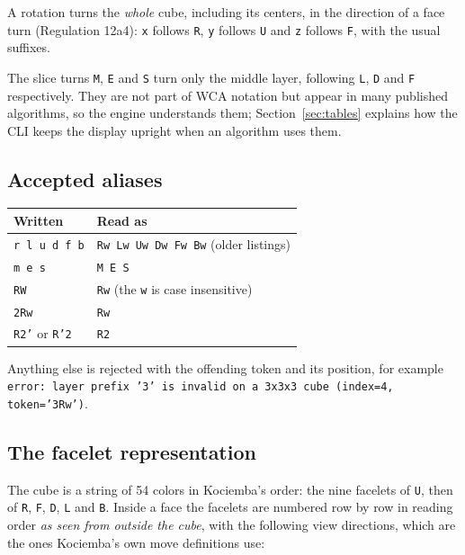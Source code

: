 A rotation turns the \emph{whole} cube, including its centers, in the direction of
a face turn (Regulation 12a4): \texttt{x} follows \texttt{R}, \texttt{y} follows
\texttt{U} and \texttt{z} follows \texttt{F}, with the usual suffixes.

The slice turns \texttt{M}, \texttt{E} and \texttt{S} turn only the middle layer,
following \texttt{L}, \texttt{D} and \texttt{F} respectively.  They are not part of
WCA notation but appear in many published algorithms, so the engine understands
them; Section~\ref{sec:tables} explains how the CLI keeps the display upright when
an algorithm uses them.

\subsection{Accepted aliases}

\begin{center}
\begin{tabular}{@{}ll@{}}
\toprule
Written & Read as \\
\midrule
\texttt{r l u d f b} & \texttt{Rw Lw Uw Dw Fw Bw} (older listings) \\
\texttt{m e s} & \texttt{M E S} \\
\texttt{RW} & \texttt{Rw} (the \texttt{w} is case insensitive) \\
\texttt{2Rw} & \texttt{Rw} \\
\texttt{R2'} or \texttt{R'2} & \texttt{R2} \\
\bottomrule
\end{tabular}
\end{center}

Anything else is rejected with the offending token and its position, for example
\texttt{error: layer prefix '3' is invalid on a 3x3x3 cube (index=4, token='3Rw')}.

\subsection{The facelet representation}
\label{sec:facelets}

The cube is a string of 54 colors in Kociemba's order: the nine facelets of
\texttt{U}, then of \texttt{R}, \texttt{F}, \texttt{D}, \texttt{L} and \texttt{B}.
Inside a face the facelets are numbered row by row in reading order \emph{as seen
from outside the cube}, with the following view directions, which are the ones
Kociemba's own move definitions use:

